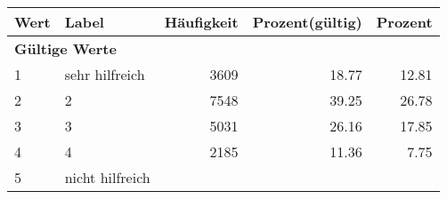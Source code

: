      \begin{longtable}{lXrrr}
     \toprule
     \textbf{Wert} & \textbf{Label} & \textbf{Häufigkeit} & \textbf{Prozent(gültig)} & \textbf{Prozent} \\
     \endhead
     \midrule
     \multicolumn{5}{l}{\textbf{Gültige Werte}}\\

     1 &
     \multicolumn{1}{X}{ sehr hilfreich   } &


       \num{3609} &
       \num[round-mode=places,round-precision=2]{18.77} &
         \num[round-mode=places,round-precision=2]{12.81} \\

     2 &
     \multicolumn{1}{X}{ 2   } &


       \num{7548} &
       \num[round-mode=places,round-precision=2]{39.25} &
         \num[round-mode=places,round-precision=2]{26.78} \\

     3 &
     \multicolumn{1}{X}{ 3   } &


       \num{5031} &
       \num[round-mode=places,round-precision=2]{26.16} &
         \num[round-mode=places,round-precision=2]{17.85} \\

     4 &
     \multicolumn{1}{X}{ 4   } &


       \num{2185} &
       \num[round-mode=places,round-precision=2]{11.36} &
         \num[round-mode=places,round-precision=2]{7.75} \\

     5 &
     \multicolumn{1}{X}{ nicht hilfreich   } &



\end{longtable}

